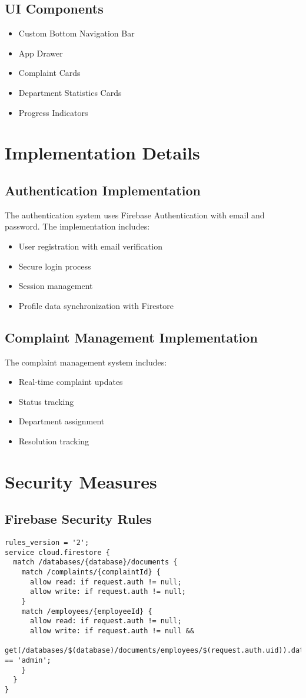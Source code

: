 \documentclass[12pt,a4paper]{article}
\begin{document}
\subsection{UI Components}
\begin{itemize}
    \item Custom Bottom Navigation Bar
    \item App Drawer
    \item Complaint Cards
    \item Department Statistics Cards
    \item Progress Indicators
\end{itemize}

\section{Implementation Details}
\subsection{Authentication Implementation}
The authentication system uses Firebase Authentication with email and password. The implementation includes:
\begin{itemize}
    \item User registration with email verification
    \item Secure login process
    \item Session management
    \item Profile data synchronization with Firestore
\end{itemize}

\subsection{Complaint Management Implementation}
The complaint management system includes:
\begin{itemize}
    \item Real-time complaint updates
    \item Status tracking
    \item Department assignment
    \item Resolution tracking
\end{itemize}

\section{Security Measures}
\subsection{Firebase Security Rules}
\begin{lstlisting}
rules_version = '2';
service cloud.firestore {
  match /databases/{database}/documents {
    match /complaints/{complaintId} {
      allow read: if request.auth != null;
      allow write: if request.auth != null;
    }
    match /employees/{employeeId} {
      allow read: if request.auth != null;
      allow write: if request.auth != null && 
        get(/databases/$(database)/documents/employees/$(request.auth.uid)).data.role == 'admin';
    }
  }
}
\end{lstlisting}
\end{document}
